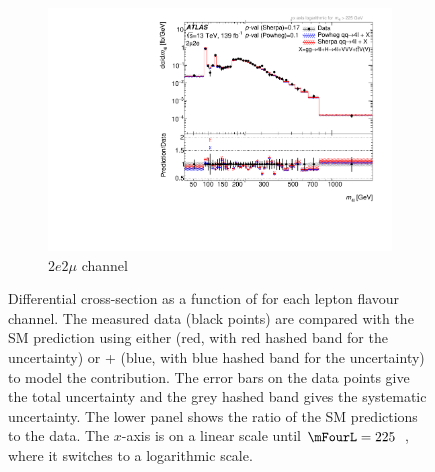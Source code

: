 \begin{figure}[htb!]
\begin{subfigure}{.49\textwidth}
      \includegraphics[width=.99\linewidth]{Figures/m4l/UnfoldedResults/linlog_Unfolded_Data_m4l_event_type2mu2e.pdf}  \caption{$2e2\mu$ channel}\label{fig:sub-third}
    \end{subfigure}
    \caption{Differential cross-section as a function of \mFourL{} for each lepton flavour channel. The measured data (black points)  are compared with the SM prediction using either \SHERPA{} (red, with red hashed band for the uncertainty) or \POWHEG{} + \pythia{} (blue, with blue hashed band for the uncertainty) to model the \qqFourL{} contribution. The error bars on the data points give the total uncertainty and the grey hashed band gives the systematic uncertainty. \Pvalue{} The lower panel shows the ratio of the SM predictions to the data.  The $x$-axis is on a linear scale until $\mFourL = 225$~\GeV, where it switches to a logarithmic scale.}
    \label{fig:m4l_flavour}
\end{figure}

